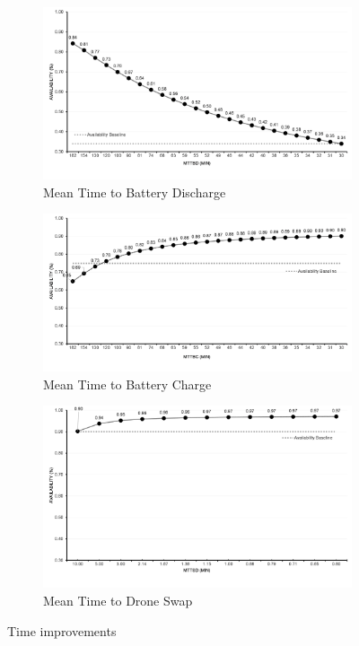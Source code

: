 \documentclass[conference]{IEEEtran}
\begin{document}
\begin{figure}[htbp]
     \centering
     \begin{subfigure}[b]{0.45\textwidth}
         \includegraphics[width=\linewidth]{img/exps/SA_007.png}
         \caption{Mean Time to Battery Discharge}
         \label{fig:ctmc_sa_bd}
     \end{subfigure}
     \hfill
     \begin{subfigure}[b]{0.45\textwidth}
         \centering
         \includegraphics[width=\linewidth]{img/exps/SA_001.png}
         \caption{Mean Time to Battery Charge}
         \label{fig:ctmc_sa_bc}
     \end{subfigure}
     \hfill
     \begin{subfigure}[b]{0.45\textwidth}
         \centering
         \includegraphics[width=\linewidth]{img/exps/SA_002.png}
         \caption{Mean Time to Drone Swap}
         \label{fig:ctmc_sa_suav}
     \end{subfigure}
        \caption{Time improvements}
        \label{fig:ctmc_sa}
\end{figure}
\end{document}
